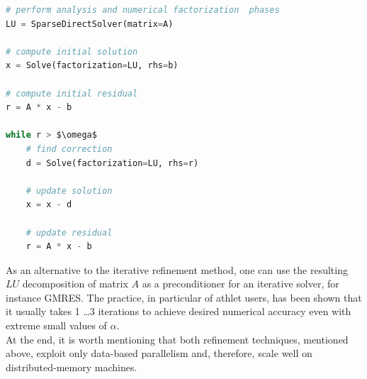 \begin{minipage}{\linewidth}

\begin{lstlisting}[language=python, caption={Pseudocode of an iterative refinement method}, frame=single, label={lst:iterative-refinement}]
# perform analysis and numerical factorization  phases
LU = SparseDirectSolver(matrix=A)

# compute initial solution
x = Solve(factorization=LU, rhs=b)

# compute initial residual
r = A * x - b

while r > $\omega$
	# find correction
	d = Solve(factorization=LU, rhs=r)
	
	# update solution
	x = x - d
	
	# update residual
	r = A * x - b
\end{lstlisting}
\end{minipage}


As an alternative to the iterative refinement method, one can use the resulting $LU$ decomposition of matrix $A$ as a preconditioner for an iterative solver, for instance GMRES. The practice, in particular of \gls{athlet} users, has been shown that it usually takes 1 \dots 3 iterations to achieve desired numerical accuracy even with extreme small values of $\alpha$.\\

At the end, it is worth mentioning that both refinement techniques, mentioned above, exploit only data-based parallelism and, therefore, scale well on distributed-memory machines.\\
